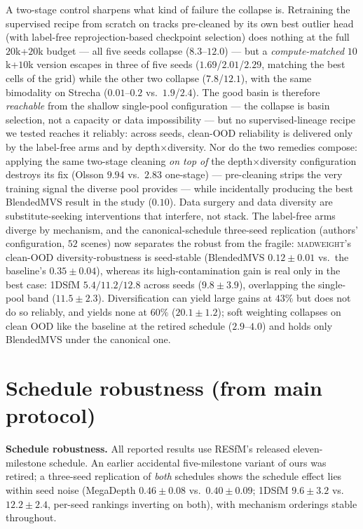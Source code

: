 \documentclass[10pt,twocolumn,letterpaper]{article}
\newcommand{\mad}{\textsc{madweight}}
\begin{document}
A two-stage control sharpens what kind of failure the collapse is. Retraining the
supervised recipe from scratch on tracks pre-cleaned by its own best outlier head (with
label-free reprojection-based checkpoint selection) does nothing at the full $20$k+$20$k
budget --- all five seeds collapse ($8.3$--$12.0$) --- but a \emph{compute-matched}
$10$k+$10$k version escapes in three of five seeds ($1.69$/$2.01$/$2.29$, matching the
best cells of the grid) while the other two collapse ($7.8$/$12.1$), with the same
bimodality on Strecha ($0.01$--$0.2$ vs.\ $1.9$/$2.4$). The good basin is therefore
\emph{reachable} from the shallow single-pool configuration --- the collapse is basin
selection, not a capacity or data impossibility --- but no supervised-lineage recipe we
tested reaches it reliably: across seeds, clean-OOD reliability is delivered only by the
label-free arms and by depth$\times$diversity. Nor do the two remedies compose: applying
the same two-stage cleaning \emph{on top of} the depth$\times$diversity configuration
destroys its fix (Olsson $9.94$ vs.\ $2.83$ one-stage) --- pre-cleaning strips the very
training signal the diverse pool provides --- while incidentally producing the best
BlendedMVS result in the study ($0.10$). Data surgery and data diversity are
substitute-seeking interventions that interfere, not stack. The
label-free arms diverge by mechanism, and the canonical-schedule three-seed replication
(authors' configuration, $52$ scenes) now separates the robust from the fragile:
\mad{}'s clean-OOD diversity-robustness is seed-stable (BlendedMVS $0.12\pm0.01$ vs.\
the baseline's $0.35\pm0.04$), whereas its high-contamination gain is real only in the
best case: 1DSfM $5.4/11.2/12.8$ across seeds ($9.8\pm3.9$), overlapping the
single-pool band ($11.5\pm2.3$). Diversification can yield large gains at $43\%$ but
does not do so reliably, and yields none at $60\%$ ($20.1\pm1.2$); soft weighting
collapses on clean OOD like the baseline at the retired schedule ($2.9$--$4.0$) and
holds only BlendedMVS under the canonical one.

\section*{Schedule robustness (from main protocol)}
\noindent\textbf{Schedule robustness.} All reported results use RESfM's released
eleven-milestone schedule. An earlier accidental five-milestone variant of ours was
retired; a three-seed replication of \emph{both} schedules shows the schedule effect lies
within seed noise (MegaDepth $0.46\pm0.08$ vs.\ $0.40\pm0.09$; 1DSfM $9.6\pm3.2$ vs.\
$12.2\pm2.4$, per-seed rankings inverting on both), with mechanism orderings stable
throughout.
\end{document}
